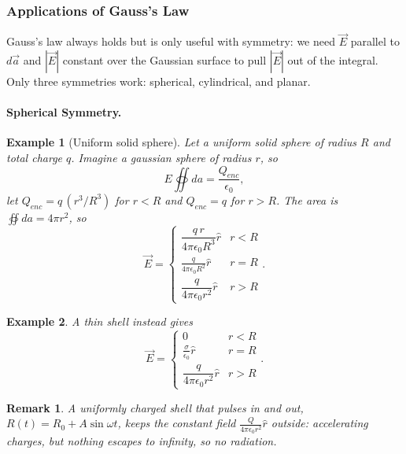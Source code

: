 \documentclass{article}
\newtheorem*{example}{Example}
\newtheorem{remark}{Remark}
\begin{document}
\subsubsection{Applications of Gauss's Law}
Gauss's law always holds but is only useful with symmetry: we need $\vec{E}$ parallel to $d\vec{a}$ and $|\vec{E}|$ constant over the Gaussian surface to pull $|\vec{E}|$ out of the integral. Only three symmetries work: spherical, cylindrical, and planar.
\paragraph{Spherical Symmetry.}
\begin{example}[Uniform solid sphere]
    \label{ex:solid-sphere}
    Let a uniform solid sphere of radius $R$ and total charge $q$. Imagine a gaussian sphere of radius $r$, so
    \[E\oiint da = \frac{Q_{enc}}{\epsilon_0},\]
    let $Q_{enc} = q\,(r^3/R^3)$ for $r < R$ and $Q_{enc} = q$ for $r > R$. The area is $\oiint da = 4\pi r^2$, so
    \[\vec{E} = \begin{cases} \dfrac{q\,r}{4\pi\epsilon_0 R^3}\hat{r} & r < R \\[8pt] \frac{q}{4\pi\epsilon_0 R^2}\hat{r} & r = R \\[8pt] \dfrac{q}{4\pi\epsilon_0 r^2}\hat{r} & r > R \end{cases}.\]
\end{example}
\begin{example}
    A thin shell instead gives
    \[\vec{E} = \begin{cases} 0 & r < R \\[8pt] \frac{\sigma}{\epsilon_0}\hat{r} & r = R \\[8pt] \dfrac{q}{4\pi\epsilon_0 r^2}\hat{r} & r > R \end{cases}.\]
\end{example}
\begin{remark}
    A uniformly charged shell that pulses in and out, $R(t) = R_0 + A\sin\omega t$, keeps the constant field $\frac{Q}{4\pi\epsilon_0 r^2}\hat{r}$ outside: accelerating charges, but nothing escapes to infinity, so no radiation.
\end{remark}
\end{document}

